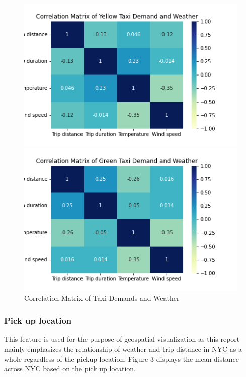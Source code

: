 \documentclass[11pt]{article}
\begin{document}
\begin{figure}[ht]
     \centering
     \begin{minipage}[b]{0.495\textwidth}
         \centering
         \includegraphics[width=\textwidth]{plots/yellow weather.png}
     \end{minipage}
     \hfill
     \begin{minipage}[b]{0.495\textwidth}
         \centering
         \includegraphics[width=\textwidth]{plots/green weather.png}
     \end{minipage}
     \hfill
     \caption{Correlation Matrix of Taxi Demands and Weather}
\end{figure}

\subsubsection{Pick up location}
This feature is used for the purpose of geospatial visualization as this report mainly emphasizes the relationship of weather and trip distance in NYC as a whole regardless of the pickup location. Figure 3 displays the mean distance across NYC based on the pick up location.
\end{document}
